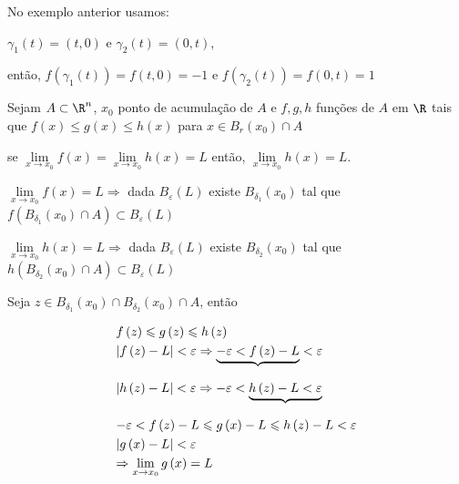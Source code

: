 \documentclass[11pt, oneside, a4paper]{gsm-l}
\begin{document}
\begin{exem}
No exemplo anterior usamos:
\end{exem}

\begin{sol}
    $\gamma _1 \left( t \right) = \left( {t,0} \right)$ e $\gamma _2 \left( t \right) = \left( {0,t} \right)$,

     então, $f\left( {\gamma _1 \left( t \right)} \right) = f\left( {t,0} \right) =  - 1$ e $f\left( {\gamma _2 \left( t \right)} \right) = f\left( {0,t} \right) = 1$
\end{sol}

\begin{teo}[do confronto]
    Sejam $A \subset \R^n$, $x_0$ ponto de acumulação de $A$ e $f,g,h$ funções de $A$ em $\R$ tais que $f\left( x \right) \leqslant g\left( x \right) \leqslant h\left( x \right)$ para $x \in B_r \left( {x_0 } \right) \cap A$

    se $\mathop {\lim }\limits_{x \to x_0 } f\left( x \right) = \mathop {\lim }\limits_{x \to x_0 } h\left( x \right) = L$ então, $\mathop {\lim }\limits_{x \to x_0 } h\left( x \right) = L$.
\end{teo}

\begin{dem}
    $\mathop {\lim }\limits_{x \to x_0 } f\left( x \right) = L \Rightarrow$ dada $B_\varepsilon  \left( L \right)$ existe $B_{\delta _1 } \left( {x_0 } \right)$ tal que $f\left( {B_{\delta _1 } \left( {x_0 } \right) \cap A} \right) \subset B_\varepsilon  \left( L \right)$

    $\mathop {\lim }\limits_{x \to x_0 } h\left( x \right) = L \Rightarrow$ dada $B_\varepsilon  \left( L \right)$ existe $B_{\delta _2 } \left( {x_0 } \right)$ tal que $h\left( {B_{\delta _2 } \left( {x_0 } \right) \cap A} \right) \subset B_\varepsilon  \left( L \right)$

    Seja $z \in B_{\delta _1 } \left( {x_0 } \right) \cap B_{\delta _2 } \left( {x_0 } \right) \cap A$, então

\[
\begin{gathered}
      f\left( z \right) \leqslant g\left( z \right) \leqslant h\left( z \right) \hfill \\
      \left| {f\left( z \right) - L} \right| < \varepsilon  \Rightarrow \underbrace { - \varepsilon  < f\left( z \right) - L}_{} < \varepsilon  \hfill \\
      \left| {h\left( z \right) - L} \right| < \varepsilon  \Rightarrow  - \varepsilon  < \underbrace {h\left( z \right) - L < \varepsilon }_{} \hfill \\
       - \varepsilon  < f\left( z \right) - L \leqslant g\left( x \right) - L \leqslant h\left( z \right) - L < \varepsilon  \hfill \\
\left| {g\left( x \right) - L} \right| < \varepsilon  \hfill \\
       \Rightarrow \mathop {\lim }\limits_{x \to x_0 } g\left( x \right) = L \hfill \\
\end{gathered}
\]

\end{dem}
\end{document}
